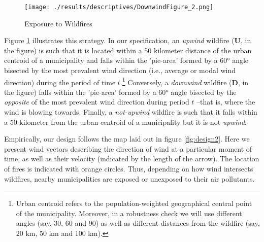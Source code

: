 \documentclass[11pt]{article}
\begin{document}
\begin{spacing}{1.3}


\begin{figure}[htpb!]
    \centering
    \vspace{1mm}
    \texttt{[image: ./results/descriptives/DownwindFigure\_2.png]}
    \caption{Exposure to Wildfires}
    \label{fig:Downwind_Fig}
    \vspace{2mm}
\end{figure}

Figure \ref{fig:Downwind_Fig} illustrates this strategy. In our specification, an \textit{upwind} wildfire (\textbf{U}, in the figure) is such that it is located within a 50 kilometer distance of the urban centroid of a municipality and falls within the 'pie-area' formed by a 60° angle bisected by the most prevalent wind direction (i.e., average or modal wind direction) during the period of time $t$.\footnote{Urban centroid refers to the population-weighted geographical central point of the municipality. Moreover, in a robustness check we will use different angles (say, 30, 60 and 90) as well as different distances from the wildfire (say, 20 km, 50 km and 100 km).} Conversely, a \textit{downwind} wildfire (\textbf{D}, in the figure) falls within the 'pie-area' formed by a 60° angle bisected by the \emph{opposite} of the most prevalent wind direction during period $t$ --that is, where the wind is blowing towards. Finally, a \textit{not-upwind} wildfire is such that it falls within a 50 kilometer from the urban centroid of a municipality but it is not \textit{upwind}. 


Empirically, our design follows the map laid out in figure \ref{fig:design2}.  Here we present wind vectors describing the direction of wind at a particular moment of time, as well as their velocity (indicated by the length of the arrow).  The location of fires is indicated with orange circles. Thus, depending on how wind intersects wildfires, nearby municipalities are exposed or unexposed to their air pollutants.  


\end{spacing}
\end{document}
